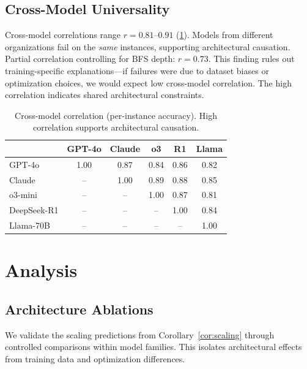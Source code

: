 \documentclass{article}
\theoremstyle{plain}
\theoremstyle{definition}
\theoremstyle{remark}
\begin{document}
\subsection{Cross-Model Universality}

Cross-model correlations range $r = 0.81$--$0.91$ (\cref{tab:crossmodel}). Models from different organizations fail on the \emph{same} instances, supporting architectural causation. Partial correlation controlling for BFS depth: $r = 0.73$. This finding rules out training-specific explanations---if failures were due to dataset biases or optimization choices, we would expect low cross-model correlation. The high correlation indicates shared architectural constraints.

\begin{table}[t]
\caption{Cross-model correlation (per-instance accuracy). High correlation supports architectural causation.}
\label{tab:crossmodel}
\vskip 0.1in
\centering
\footnotesize
\begin{tabular}{@{}lccccc@{}}
\toprule
& \textbf{GPT-4o} & \textbf{Claude} & \textbf{o3} & \textbf{R1} & \textbf{Llama} \\
\midrule
GPT-4o & 1.00 & 0.87 & 0.84 & 0.86 & 0.82 \\
Claude & -- & 1.00 & 0.89 & 0.88 & 0.85 \\
o3-mini & -- & -- & 1.00 & 0.87 & 0.81 \\
DeepSeek-R1 & -- & -- & -- & 1.00 & 0.84 \\
Llama-70B & -- & -- & -- & -- & 1.00 \\
\bottomrule
\end{tabular}
\vskip -0.1in
\end{table}


\section{Analysis}
\label{sec:analysis}

\subsection{Architecture Ablations}
\label{sec:ablations}

We validate the scaling predictions from Corollary~\ref{cor:scaling} through controlled comparisons within model families. This isolates architectural effects from training data and optimization differences.
\end{document}
